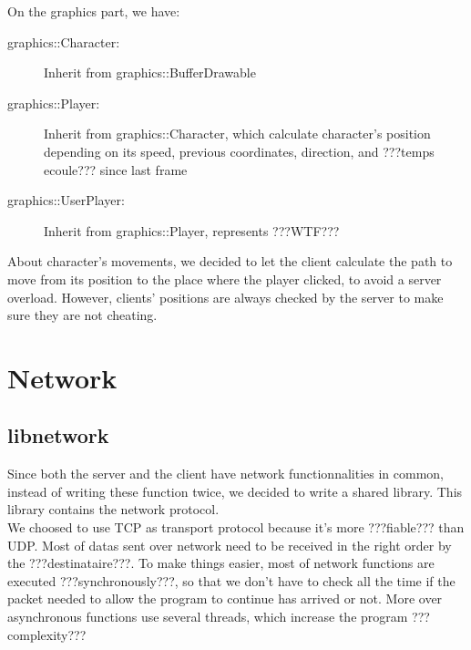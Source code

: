\documentclass{scrreprt}
\begin{document}
			On the graphics part, we have:
			\begin{description}
			\item[graphics::Character:]{Inherit from graphics::BufferDrawable}
			\item[graphics::Player:]{Inherit from graphics::Character, which calculate character's position depending on its speed, previous coordinates, direction, and ???temps ecoule??? since last frame}
			\item[graphics::UserPlayer:]{Inherit from graphics::Player, represents ???WTF???}
			\end{description}

			About character's movements, we decided to let the client calculate the path to move from its position to the place where the player clicked, to avoid a server overload. However, clients' positions are always checked by the server to make sure they are not cheating.

			\section{Network}
			\subsection{libnetwork}
			Since both the server and the client have network functionnalities in common, instead of writing these function twice, we decided to write a shared library. This library contains the network protocol.\\

				We choosed to use TCP as transport protocol because it's more ???fiable??? than UDP. Most of datas sent over network need to be received in the right order by the ???destinataire???. To make things easier, most of network functions are executed ???synchronously???, so that we don't have to check all the time if the packet needed to allow the program to continue has arrived or not. More over asynchronous functions use several threads, which increase the program ???complexity???\\
\end{document}
